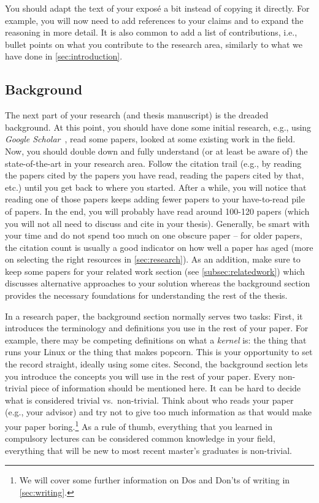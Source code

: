 \documentclass[a4paper]{article}
\begin{document}
You should adapt the text of your expos\'e a bit instead of copying it directly.
For example, you will now need to add references to your claims and to expand the reasoning in more detail.
It is also common to add a list of contributions, i.e., bullet points on what you contribute to the research area, similarly to what we have done in \cref{sec:introduction}.

\subsection{Background}

The next part of your research (and thesis manuscript) is the dreaded background.
At this point, you should have done some initial research, e.g., using \emph{Google Scholar}~\cite{gscholar}, read some papers, looked at some existing work in the field.
Now, you should double down and fully understand (or at least be aware of) the state-of-the-art in your research area.
Follow the citation trail (e.g., by reading the papers cited by the papers you have read, reading the papers cited by that, etc.) until you get back to where you started.
After a while, you will notice that reading one of those papers keeps adding fewer papers to your have-to-read pile of papers.
In the end, you will probably have read around 100-120 papers (which you will not all need to discuss and cite in your thesis).
Generally, be smart with your time and do not spend too much on one obscure paper -- for older papers, the citation count is usually a good indicator on how well a paper has aged (more on selecting the right resources in \cref{sec:research}).
As an addition, make sure to keep some papers for your related work section (see \cref{subsec:relatedwork}) which discusses alternative approaches to your solution whereas the background section provides the necessary foundations for understanding the rest of the thesis.

In a research paper, the background section normally serves two tasks:
First, it introduces the terminology and definitions you use in the rest of your paper.
For example, there may be competing definitions on what a \emph{kernel} is: the thing that runs your Linux or the thing that makes popcorn.
This is your opportunity to set the record straight, ideally using some cites.
Second, the background section lets you introduce the concepts you will use in the rest of your paper.
Every non-trivial piece of information should be mentioned here.
It can be hard to decide what is considered trivial vs.~non-trivial.
Think about who reads your paper (e.g., your advisor) and try not to give too much information as that would make your paper boring.\footnote{We will cover some further information on Dos and Don'ts of writing in \cref{sec:writing}.}
As a rule of thumb, everything that you learned in compulsory lectures can be considered common knowledge in your field, everything that will be new to most recent master's graduates is non-trivial.
\end{document}
